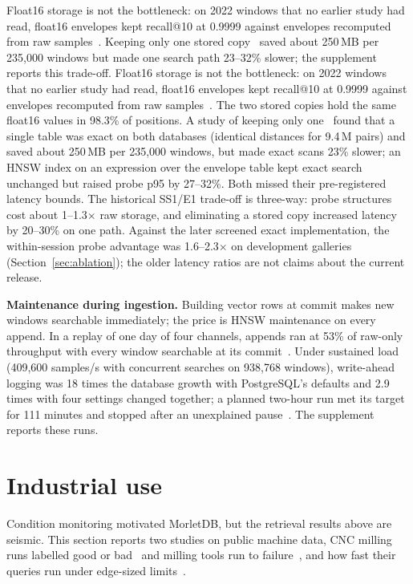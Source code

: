 \documentclass[sigconf]{acmart}
\newcommand{\M}{MorletDB}
\begin{document}
\ifdefined\SigmodSubmission Float16 storage is not the bottleneck: on 2022 windows that no earlier study had read, float16 envelopes kept recall@10 at 0.9999 against envelopes recomputed from raw samples~\cite{r1b}. Keeping only one stored copy~\cite{ss1} saved about 250\,MB per 235,000 windows but made one search path 23--32\% slower; the supplement reports this trade-off.\else
Float16 storage is not the bottleneck: on 2022 windows that no earlier study had read, float16 envelopes kept recall@10 at 0.9999 against envelopes recomputed from raw samples~\cite{r1b}. The two stored copies hold the same float16 values in 98.3\% of positions. A study of keeping only one~\cite{ss1} found that a single  table was exact on both databases (identical distances for 9.4\,M pairs) and saved about 250\,MB per 235,000 windows, but made exact scans 23\% slower; an HNSW index on an expression over the envelope table kept exact search unchanged but raised probe p95 by 27--32\%. Both missed their pre-registered latency bounds. The historical SS1/E1 trade-off is three-way: probe structures cost about 1--1.3$\times$ raw storage, and eliminating a stored copy increased latency by 20--30\% on one path. Against the later screened exact implementation, the within-session probe advantage was 1.6--2.3$\times$ on development galleries (Section~\ref{sec:ablation}); the older latency ratios are not claims about the current release.
\fi

\textbf{Maintenance during ingestion.} Building vector rows at commit makes new windows searchable immediately; the price is HNSW maintenance on every append. In a replay of one day of four channels, appends ran at 53\% of raw-only throughput with every window searchable at its commit~\cite{bl1}. Under sustained load (409,600 samples/s with concurrent searches on 938,768 windows), write-ahead logging was 18 times the database growth with PostgreSQL's defaults and 2.9 times with four settings changed together; a planned two-hour run met its target for 111 minutes and stopped after an unexplained pause~\cite{pilot}. The supplement reports these runs.

\section{Industrial use}\label{sec:industrial}
Condition monitoring motivated \M{}, but the retrieval results above are seismic. This section reports two studies
on public machine data, CNC milling runs labelled good or bad~\cite{iu1} and milling tools run to failure~\cite{iu2},
and how fast their queries run under edge-sized limits~\cite{iu1e}.
\end{document}
